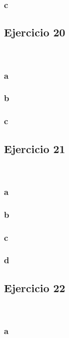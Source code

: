 \documentclass{article}
\begin{document}
\subsubsection*{c}

\subsection*{Ejercicio 20}

\

\subsubsection*{a}

\subsubsection*{b}

\subsubsection*{c}

\subsection*{Ejercicio 21}

\

\subsubsection*{a}

\subsubsection*{b}

\subsubsection*{c}

\subsubsection*{d}

\subsection*{Ejercicio 22}

\

\subsubsection*{a}
\end{document}
